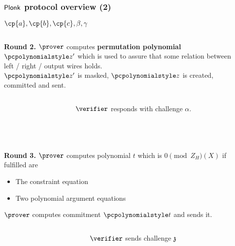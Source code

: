 \documentclass[aspectratio=169,handout]{beamer}
\renewcommand{\emph}[1]{\textbf{#1}}
\renewcommand{\myskip}{0.5\baselineskip}
\begin{document}
  \begin{frame}[t]
    \frametitle{$\textnormal{\textsf{Plonk}}$ protocol overview (2)}
    $\cp{a}, \cp{b}, \cp{c}, \beta, \gamma$
  \begin{columns}
    \begin{column}{0.5\linewidth}
      \textbf{Round 2.} $\prover$ computes \emph{permutation polynomial}
      $\p{z'}$ which is used to assure that some relation between left / right /
      output wires holds.\\
      $\p{z'}$ is masked, $\p{z}$ is created, committed and sent.
    \end{column}
    \begin{column}{0.5\linewidth}
    \end{column}
  \end{columns}
  \begin{columns}
    \begin{column}{0.5\linewidth}
    \end{column}
    \begin{column}{0.5\linewidth}
      $\verifier$ responds with challenge $\alpha$.
    \end{column}
  \end{columns}\\[\myskip]
  
  \begin{columns}
    \begin{column}{0.5\linewidth}
      \textbf{Round 3.} $\prover$ computes polynomial $t$ which is $0 \pmod
      Z_H(X)$ if fulfilled are
    \begin{itemize}
    \item The constraint equation
    \item Two polynomial argument equations
    \end{itemize}
    $\prover$ computes commitment $\p{t}$ and sends it.
  \end{column}
  \begin{column}{0.5\linewidth}
  \end{column}
\end{columns}
\begin{columns}
  \begin{column}{0.5\linewidth}
  \end{column}
  \begin{column}{0.5\linewidth}
    $\verifier$ sends challenge $\mathfrak{z}$
  \end{column}
  \end{columns}
  \end{frame}
\end{document}
